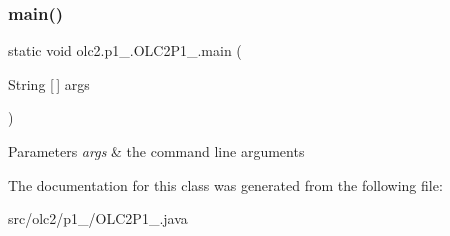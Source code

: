 \subsubsection{\texorpdfstring{main()}{main()}}
{\footnotesize\ttfamily static void olc2.\+p1\+\_.\+O\+L\+C2\+P1\+\_.\+main (\begin{DoxyParamCaption}\item[{String \mbox{[}$\,$\mbox{]}}]{args }\end{DoxyParamCaption})\hspace{0.3cm}{\ttfamily [static]}}


\begin{DoxyParams}{Parameters}
{\em args} & the command line arguments \\
\hline
\end{DoxyParams}


The documentation for this class was generated from the following file\+:\begin{DoxyCompactItemize}
\item 
src/olc2/p1\+\_/O\+L\+C2\+P1\+\_.\+java\end{DoxyCompactItemize}
